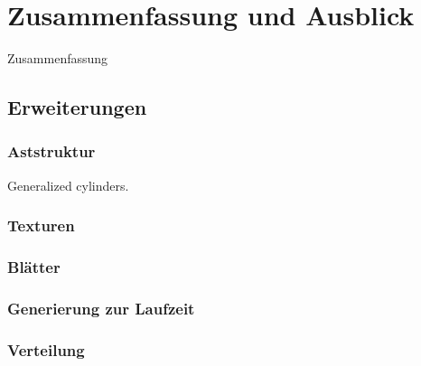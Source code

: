 \chapter{Zusammenfassung und Ausblick}

Zusammenfassung

\section{Erweiterungen}

\subsection{Aststruktur}

Generalized cylinders.

\subsection{Texturen}

\subsection{Blätter}

\subsection{Generierung zur Laufzeit}

\subsection{Verteilung}